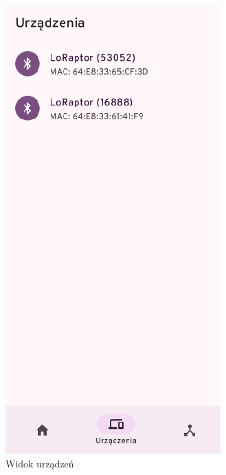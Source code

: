 \begin{figure}[H]
\begin{minipage}[b]{0.45\textwidth}
	\end{minipage}
	\hfill
	\begin{minipage}[b]{0.45\textwidth}
		\centering
		\includegraphics[width=\textwidth]{root/raptchat_devices_alt.png}
		\caption{Widok urządzeń}
	\end{minipage}
\end{figure}


